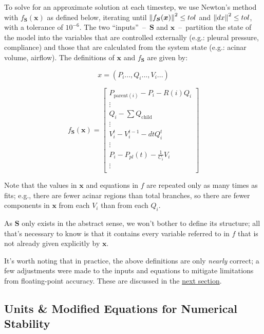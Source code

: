 To solve for an approximate solution at each timestep, we use Newton's method with $f_{\bm{S}}(\bm{x})$ as
defined below, iterating until $\left\lVert f_{\bm{S}}(\bm{x})\right\rVert^2 \le tol$ and $\left\lVert dx\right\rVert^2 \le tol$, with
a tolerance of $10^{-6}$. The two ``inputs''~--~$\bm{S}$ and $\bm{x}$~--~partition the state of the
model into the variables that are controlled externally (e.g.: pleural pressure, compliance) and
those that are calculated from the system state (e.g.: acinar volume, airflow). The definitions of
$\bm{x}$ and $f_{\bm{S}}$ are given by:

\begin{equation*}
    x = (P_i..., Q_i..., V_i...)
\end{equation*}

\begin{equation*}
    f_{\bm{S}}(\bm{x}) =
        \begin{bmatrix}
            P_{\text{parent}(i)} - P_i - R(i)Q_i \\
            \vdots \\
            Q_i - \sum Q_{\text{child}} \\
            \vdots \\
            V_i^t - V_i^{t-1} - dtQ_i^t \\
            \vdots \\
            P_i - P_{pl}(t) - \frac{1}{C_i} V_i \\
            \vdots \\
        \end{bmatrix}
\end{equation*}

Note that the values in $\bm{x}$ and equations in $f$ are repeated only as many times as fits; e.g.,
there are fewer acinar regions than total branches, so there are fewer components in $\bm{x}$ from
each $V_i$ than from each $Q_i$.

As $\bm{S}$ only exists in the abstract sense, we won't bother to define its structure; all that's
necessary to know is that it contains every variable referred to in $f$ that is not already given
explicitly by $\bm{x}$.

\breakpars

It's worth noting that in practice, the above definitions are only \textit{nearly} correct; a few
adjustments were made to the inputs and equations to mitigate limitations from floating-point
accuracy. These are discussed in the \hyperref[sec:units-and-numerical-stability]{next section}.

\subsection{Units \& Modified Equations for Numerical Stability} \label{sec:units-and-numerical-stability}

